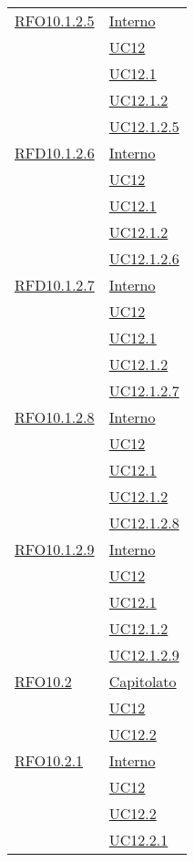 \begin{longtable}{|>{\centering}m{5cm}|m{5cm}<{\centering}|}
 \hyperlink{RFO10.1.2.5}{RFO10.1.2.5} 
 & \hyperlink{Interno}{Interno}\\
& \hyperref[UC12]{UC12}\\
& \hyperref[UC12.1]{UC12.1}\\
& \hyperref[UC12.1.2]{UC12.1.2}\\
& \hyperref[UC12.1.2.5]{UC12.1.2.5}\\\hline

 \hyperlink{RFD10.1.2.6}{RFD10.1.2.6} 
 & \hyperlink{Interno}{Interno}\\
& \hyperref[UC12]{UC12}\\
& \hyperref[UC12.1]{UC12.1}\\
& \hyperref[UC12.1.2]{UC12.1.2}\\
& \hyperref[UC12.1.2.6]{UC12.1.2.6}\\\hline

 \hyperlink{RFD10.1.2.7}{RFD10.1.2.7} 
 & \hyperlink{Interno}{Interno}\\
& \hyperref[UC12]{UC12}\\
& \hyperref[UC12.1]{UC12.1}\\
& \hyperref[UC12.1.2]{UC12.1.2}\\
& \hyperref[UC12.1.2.7]{UC12.1.2.7}\\\hline

\hyperlink{RFO10.1.2.8}{RFO10.1.2.8} 
 & \hyperlink{Interno}{Interno}\\
& \hyperref[UC12]{UC12}\\
& \hyperref[UC12.1]{UC12.1}\\
& \hyperref[UC12.1.2]{UC12.1.2}\\
& \hyperref[UC12.1.2.8]{UC12.1.2.8}\\\hline

\hyperlink{RFO10.1.2.9}{RFO10.1.2.9} 
 & \hyperlink{Interno}{Interno}\\
& \hyperref[UC12]{UC12}\\
& \hyperref[UC12.1]{UC12.1}\\
& \hyperref[UC12.1.2]{UC12.1.2}\\
& \hyperref[UC12.1.2.9]{UC12.1.2.9}\\\hline

 \hyperlink{RFO10.2}{RFO10.2} 
 & \hyperlink{Capitolato}{Capitolato}\\\
& \hyperref[UC12]{UC12}\\
& \hyperref[UC12.2]{UC12.2}\\\hline

 \hyperlink{RFO10.2.1}{RFO10.2.1} 
 & \hyperlink{Interno}{Interno}\\
& \hyperref[UC12]{UC12}\\
& \hyperref[UC12.2]{UC12.2}\\
& \hyperref[UC12.2.1]{UC12.2.1}\\\hline


\end{longtable}

